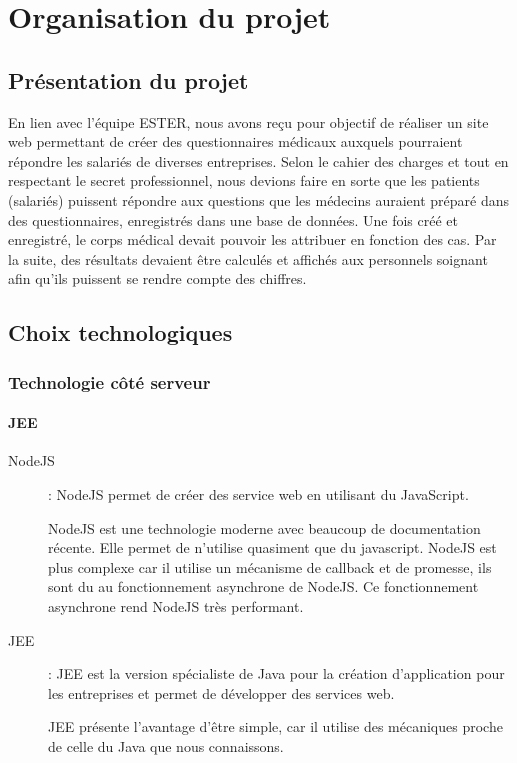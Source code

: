 \chapter{Organisation du projet}

\section{Présentation du projet}

En lien avec l'équipe ESTER, nous avons reçu pour objectif de réaliser un site web permettant de créer des questionnaires médicaux auxquels pourraient répondre les salariés de diverses entreprises. Selon le cahier des charges et tout en respectant le secret professionnel, nous devions faire en sorte que les patients (salariés) puissent répondre aux questions que les médecins auraient préparé dans des questionnaires, enregistrés dans une base de données. Une fois créé et enregistré, le corps médical devait pouvoir les attribuer en fonction des cas. Par la suite, des résultats devaient être calculés et affichés aux personnels soignant afin qu'ils puissent se rendre compte des chiffres. 

\section{Choix technologiques}

\subsection{Technologie côté serveur}

\subsubsection{JEE}

\begin{description}

\item[NodeJS] : NodeJS permet de créer des service web en utilisant du JavaScript. 

NodeJS est une technologie moderne avec beaucoup de documentation récente. Elle permet de n'utilise quasiment que du javascript. NodeJS est plus complexe car il utilise un mécanisme de callback et de promesse, ils sont du au fonctionnement asynchrone de NodeJS. Ce fonctionnement asynchrone rend NodeJS très performant.

\item[JEE] : JEE est la version spécialiste de Java pour la création 
d'application pour les entreprises et permet de développer des services web.

JEE présente l'avantage d'être simple, car il utilise des mécaniques proche de celle du Java que nous connaissons. 

\end{description}

